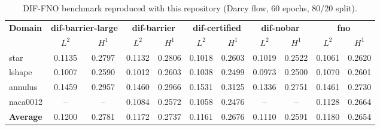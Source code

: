 \begin{table}[h]
\centering
\caption{DIF-FNO benchmark reproduced with this repository (Darcy flow, 60 epochs, 80/20 split).}
\label{tab:benchmark}
\begin{tabular}{l|cc|cc|cc|cc|cc|}
\hline
\textbf{Domain} & \multicolumn{2}{c|}{\textbf{dif-barrier-large}} & \multicolumn{2}{c|}{\textbf{dif-barrier}} & \multicolumn{2}{c|}{\textbf{dif-certified}} & \multicolumn{2}{c|}{\textbf{dif-nobar}} & \multicolumn{2}{c|}{\textbf{fno}} \\
 & $L^2$ & $H^1$ & $L^2$ & $H^1$ & $L^2$ & $H^1$ & $L^2$ & $H^1$ & $L^2$ & $H^1$ \\
\hline
star & 0.1135 & 0.2797 & 0.1132 & 0.2806 & 0.1018 & 0.2603 & 0.1019 & 0.2522 & 0.1061 & 0.2620 \\
lshape & 0.1007 & 0.2590 & 0.1012 & 0.2603 & 0.1038 & 0.2499 & 0.0973 & 0.2500 & 0.1070 & 0.2601 \\
annulus & 0.1459 & 0.2957 & 0.1460 & 0.2966 & 0.1531 & 0.3125 & 0.1336 & 0.2751 & 0.1461 & 0.2730 \\
naca0012 & -- & -- & 0.1084 & 0.2572 & 0.1058 & 0.2476 & -- & -- & 0.1128 & 0.2664 \\
\textbf{Average} & 0.1200 & 0.2781 & 0.1172 & 0.2737 & 0.1161 & 0.2676 & 0.1110 & 0.2591 & 0.1180 & 0.2654 \\
\hline
\end{tabular}
\end{table}
